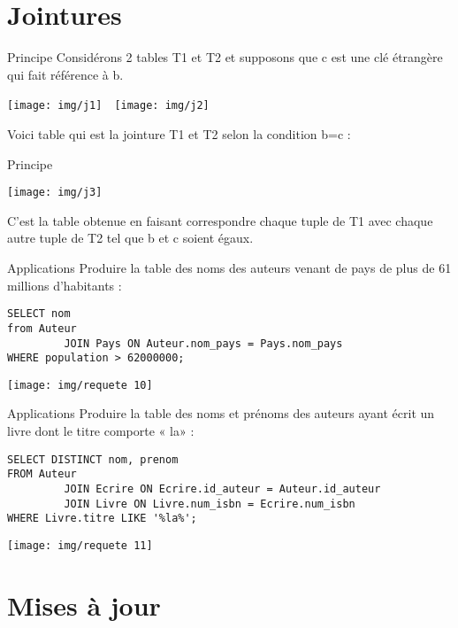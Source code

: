 \documentclass[10pt]{nsibeamer}
\begin{document}
\section{Jointures}
\begin{frame}{Principe}
	Considérons 2 tables T1 et T2 et supposons que c est une clé étrangère qui fait référence à b.\pause
    \begin{center}
        \texttt{[image: img/j1]}\ \ \texttt{[image: img/j2]}
        \end{center}\pause
    Voici table qui est la \alert{jointure} T1 et T2 selon la condition b=c :
\end{frame}

\begin{frame}{Principe}
    \begin{center}
        \texttt{[image: img/j3]}
        \end{center}\pause
       C'est la table obtenue en faisant correspondre chaque tuple de T1 avec chaque autre tuple de T2 tel que b et c soient égaux.
\end{frame}
\begin{frame}[fragile]{Applications}
	Produire la table des noms des auteurs venant de pays de plus de 61 millions d'habitants :\pause
    \begin{verbatim}
SELECT nom
from Auteur
         JOIN Pays ON Auteur.nom_pays = Pays.nom_pays
WHERE population > 62000000;
    \end{verbatim}
    \pause
     \begin{center}
            \texttt{[image: img/requete 10]}
     \end{center}
\end{frame}



\begin{frame}[fragile]{Applications}
	Produire la table des noms et prénoms des auteurs ayant écrit un livre dont le titre comporte « la»  :\pause
\begin{verbatim}
SELECT DISTINCT nom, prenom
FROM Auteur
         JOIN Ecrire ON Ecrire.id_auteur = Auteur.id_auteur
         JOIN Livre ON Livre.num_isbn = Ecrire.num_isbn
WHERE Livre.titre LIKE '%la%';
\end{verbatim}
\pause
     \begin{center}
            \texttt{[image: img/requete 11]}
     \end{center}
\end{frame}
\section{Mises à jour}
\end{document}
